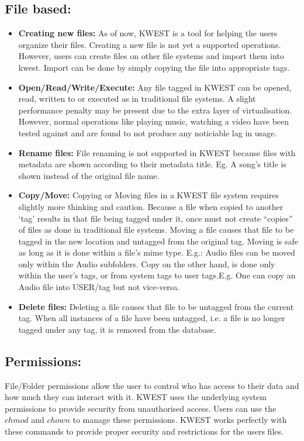\subsection{File based:}
\begin{itemize}
\item \textbf{Creating new files:}
As of now, KWEST is a tool for helping the users organize their files. Creating a new file is not yet a supported operations. However, users can create files on other file systems and import them into kwest. Import can be done by simply copying the file into appropriate tags.
\item \textbf{Open/Read/Write/Execute:}
Any file tagged in KWEST can be opened, read, written to or executed as in traditional file systems. A slight performance penalty may be present due to the extra layer of virtualisation. However, normal operations like playing music, watching a video have been tested against and are found to not produce any noticiable lag in usage.
\item \textbf{Rename files:}
File renaming is not supported in KWEST because files with metadata are shown according to their metadata title. \newline
Eg. A song's title is shown instead of the original file name. 
\item \textbf{Copy/Move:}
Copying or Moving files in a KWEST file system requires slightly more thinking and caution. Because a file when copied to another `tag' results in that file being tagged under it, once must not create ``copies'' of files as done in traditional file systems. Moving a file causes that file to be tagged in the new location and untagged from the original tag. Moving is safe as long as it is done within a file's mime type. \newline
E.g.: Audio files can be moved only within the Audio subfolders. Copy on the other hand, is done only within the user's tags, or from system tags to user tags.E.g. One can copy an Audio file into USER/tag but not vice-versa.
\item \textbf{Delete files:}
Deleting a file causes that file to be untagged from the current tag. When all instances of a file have been untagged, i.e. a file is no longer tagged under any tag, it is removed from the database.
\end{itemize}

\subsection{Permissions:}
File/Folder permissions allow the user to control who has access to their data and how much they can interact with it. KWEST uses the underlying system permissions to provide security from unauthorised access. Users can use the $chmod$ and $chown$ to manage these permissions. KWEST works perfectly with these commands to provide proper security and restrictions for the users files.

